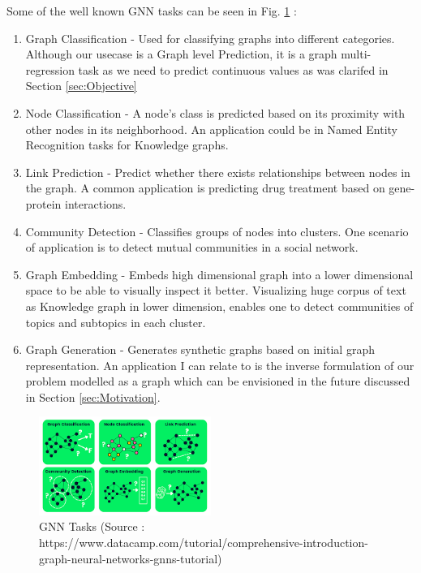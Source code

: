\documentclass{report} %
\begin{document}
Some of the well known \ac{GNN} tasks can be seen in Fig. \ref{fig:GNN Predictions} :
\begin{enumerate}
    \item Graph Classification - Used for classifying graphs into different categories. Although our usecase is a Graph level Prediction, it is a graph multi-regression 
    task as we need to predict continuous values as was clarifed in Section \ref{sec:Objective}
    \item Node Classification - A node's class is predicted based on its proximity with other nodes in its neighborhood. An application could be in Named Entity 
    Recognition tasks for Knowledge graphs.
    \item Link Prediction - Predict whether there exists relationships between nodes in the graph. A common application is predicting drug treatment based on gene-protein interactions.
    \item Community Detection - Classifies groups of nodes into clusters. One scenario of application is to detect mutual communities in a social network.
    \item Graph Embedding - Embeds high dimensional graph into a lower dimensional space to be able to visually inspect it better. Visualizing huge corpus of text as 
    Knowledge graph in lower dimension, enables one to detect communities of topics and subtopics in each cluster.
    \item Graph Generation - Generates synthetic graphs based on initial graph representation. An application I can relate to is the inverse formulation of our problem 
    modelled as a graph which can be envisioned in the future discussed in Section \ref{sec:Motivation}.
\end{enumerate}

\begin{figure}[H]
    \centering
    \includegraphics[width=0.5\textwidth]{./ReportImages/GraphTasks.png} 
    \caption{\ac{GNN} Tasks (Source : https://www.datacamp.com/tutorial/comprehensive-introduction-graph-neural-networks-gnns-tutorial) }
    \label{fig:GNN Predictions}
\end{figure}
\end{document}
